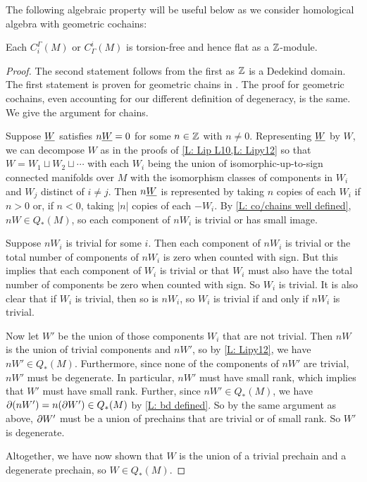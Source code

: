 The following algebraic property will be useful below as we consider homological algebra with geometric cochains:

\begin{lemma}
	Each $C_i^\Gamma(M)$ or $C_\Gamma^i(M)$ is torsion-free and hence flat as a $\mathbb{Z}$-module.
\end{lemma}

\begin{proof}
	The second statement follows from the first as $\mathbb{Z}$ is a Dedekind domain.
	The first statement is proven for geometric chains in \cite[Lemma 34]{Lipy14}.
	The proof for geometric cochains, even accounting for our different definition of degeneracy, is the same.
	We give the argument for chains.

	Suppose $\underline{W}$ satisfies $n \underline{W} = 0$ for some $n \in \mathbb{Z}$ with $n \neq 0$. 
	Representing $\underline{W}$ by $W$, we can decompose $W$ as in the proofs of \cref{L: Lip L10,L: Lipy12} so that $W = W_1 \sqcup W_2 \sqcup \cdots$ with each $W_i$ being the union of isomorphic-up-to-sign connected manifolds over $M$ with the isomorphism classes of components in $W_i$ and $W_j$ distinct of $i\neq j$. 
	Then $n \underline{W}$ is represented by taking $n$ copies of each $W_i$ if $n > 0$ or, if $n < 0$, taking $|n|$ copies of each $-W_i$. 
	By \cref{L: co/chains well defined}, $n W \in Q_*(M)$, so each component of $n W_i$ is trivial or has small image. 
	
	Suppose  $n W_i$ is trivial for some $i$. 
 	Then each component of $n W_i$ is trivial or the total number of components of $n W_i$ is zero when counted with sign.  
	But this implies that each component of $W_i$ is trivial or that $W_i$ must also have the total number of components be zero when counted with sign.
	So $W_i$ is trivial.
	It is also clear that if $W_i$ is trivial, then so is $n W_i$, so $W_i$ is trivial if and only if $n W_i$ is trivial. 

	Now let $W'$ be the union of those components $W_i$ that are not trivial. 
	Then $nW$ is the union of trivial components and $n W'$, so by \cref{L: Lipy12}, we have $n W' \in Q_*(M)$.
	Furthermore, since none of the components of $n W'$ are trivial, $n W'$ must be degenerate. 
	In particular, $n W'$ must have small rank, which implies that $W'$ must have small rank. 
	Further, since $n W' \in Q_*(M)$, we have $\partial (n W') = n (\partial W') \in Q_*(M)$ by \cref{L: bd defined}. 
	So by the same argument as above, $\partial W'$ must be a union of prechains that are trivial or of small rank.
	So $W'$ is degenerate.  

	Altogether, we have now shown that $W$ is the union of a trivial prechain and a degenerate prechain, so $W \in Q_*(M)$. 
\end{proof}

